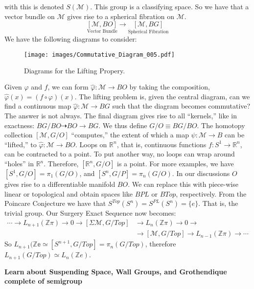         with this is denoted $S(\mathcal{M})$. This group
        is a classifying space. So we have that a vector
        bundle on $\mathcal{M}$ gives rise to a spherical
        fibration on $\mathcal{M}$.
        \begin{equation*}
            \underset{\textrm{Vector Bundle}}{[\mathcal{M},BO]}
            \longrightarrow
            \underset{\textrm{Spherical Fibration}}{[\mathcal{M},BG]}
        \end{equation*}
        We have the following diagrams to consider:
        \begin{figure}
            \centering
            \captionsetup{type=figure}
            \texttt{[image: images/Commutative\_Diagram\_005.pdf]}
            \caption{Diagrams for the Lifting Propery.}
            \label{fig:Surgery_Theory_Lifting_Property_Diagram}
        \end{figure}
        Given $\varphi$ and $f$, we can form
        $\hat{\varphi}:\mathcal{M}\rightarrow{BO}$ by taking
        the composition, $\hat{\varphi}(x)=(f\circ\varphi)(x)$.
        The lifting problem is, given the central diagram,
        can we find a continuous map
        $\hat{\varphi}:\mathcal{M}\rightarrow{BG}$ such that
        the diagram becomes commutative? The answer is not always.
        The final diagram gives rise to all ``kernels,'' like
        in exactness: $BG/BO\dashrightarrow{BO}\rightarrow{BG}$.
        We thus define $G/O\equiv{BG/BO}$. The homotopy collection
        $[\mathcal{M},G/O]$ ``computes,'' the extent of which a map
        $\psi:\mathcal{M}\rightarrow{B}$ can be ``lifted,'' to
        $\hat{\varphi}:\mathcal{M}\rightarrow{BO}$.
        Loops on $\mathbb{R}^{n}$, that is, continuous functions
        $f:S^{1}\rightarrow\mathbb{R}^{n}$, can be
        contracted to a point. To put another way, no loops
        can wrap around ``holes'' in $\mathbb{R}^{n}$.
        Therefore, $[\mathbb{R}^{n},G/O]$ is a point. For
        more examples, we have
        $[S^{1},G/O]=\pi_{1}(G/O)$, and
        $[S^{n},G/P]=\pi_{n}(G/O)$. In our discussions
        $O$ gives rise to a differentiable manifold $BO$.
        We can replace this with piece-wise linear or
        topological and obtain spaces like
        $BPL$ or $BTop$, respectively.
        From the Poincare Conjecture we have that
        $S^{Top}(S^{n})=S^{PL}(S^{n})=\{e\}$. That is,
        the trivial group. Our Surgery Exact Sequence now
        becomes:
        \begin{align*}
            \cdots\rightarrow{L}_{n+1}(\mathbb{Z}\pi)
            \rightarrow0\rightarrow
            [\Sigma\mathcal{M},G/Top]&\rightarrow
            L_{n}(\mathbb{Z}\pi)\rightarrow
            0\rightarrow\\
            &\rightarrow[\mathcal{M},G/Top]\rightarrow
            L_{n-1}(\mathbb{Z}\pi)\rightarrow\cdots
        \end{align*}
        So $L_{n+1}(\mathbb{Ze}\simeq[S^{n+1},G/Top]%
            =\pi_{n}(G/Top)$,
        therefore $L_{n+1}(G/Top)\simeq{L_{n}(\mathbb{Z}e)}$.
        \par\hfill\par
        \textbf{Learn about Suspending Space, Wall Groups,
                and Grothendique complete of semigroup}
